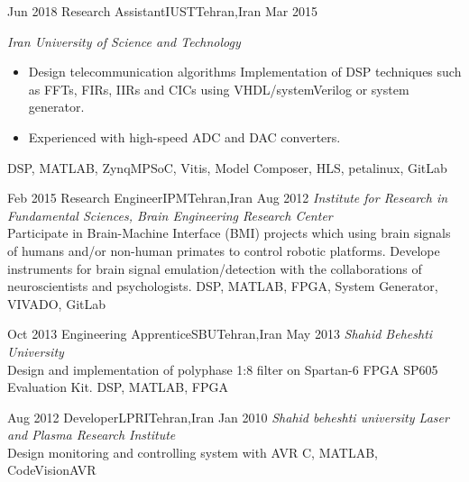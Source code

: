 
\begin{experiences}
  \experience
  {Jun 2018} {Research Assistant}{IUST}{Tehran,Iran}
  {Mar 2015} {
    \emph{Iran University of Science and Technology}
    \begin{itemize}
      \item  Design telecommunication algorithms Implementation of DSP techniques such as
            FFTs, FIRs, IIRs and CICs using VHDL/systemVerilog or system generator.
      \item Experienced with high-speed ADC and DAC converters.
    \end{itemize}
  }
  {DSP, MATLAB, ZynqMPSoC, Vitis, Model Composer, HLS, petalinux, GitLab}

  \emptySeparator

  \experience
  {Feb 2015} {Research Engineer}{IPM}{Tehran,Iran}
  {Aug 2012} {
    \emph{Institute for Research in Fundamental Sciences, Brain Engineering Research Center}\\
    Participate in Brain-Machine Interface (BMI) projects which using brain signals of humans
    and/or non-human primates to control robotic platforms. Develope instruments for brain
    signal emulation/detection with the collaborations of neuroscientists and psychologists.
  }
  {DSP, MATLAB, FPGA, System Generator, VIVADO, GitLab}

  \emptySeparator

  \experience
  {Oct 2013} {Engineering Apprentice}{SBU}{Tehran,Iran}
  {May 2013} {
    \emph{Shahid Beheshti University}\\
    Design and implementation of polyphase 1:8 filter on Spartan-6 FPGA SP605 Evaluation Kit.
  }
  {DSP, MATLAB, FPGA}

  \emptySeparator

  \experience
  {Aug 2012} {Developer}{LPRI}{Tehran,Iran}
  {Jan 2010} {
    \emph{Shahid beheshti university Laser and Plasma Research Institute}\\
    Design  monitoring and controlling system with AVR
  }
  {C, MATLAB, CodeVisionAVR}
\end{experiences}
